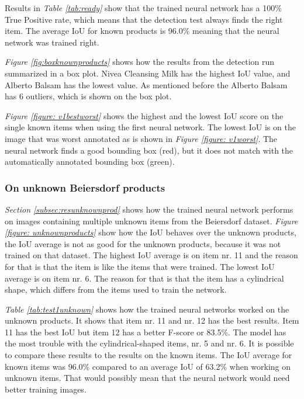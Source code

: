 Results in \textit{Table \ref{tab:ready}} show that the trained neural network has a 100\% True Positive rate, which means that the detection test always finds the right item. The average IoU for known products is 96.0\% meaning that the neural network was trained right.

\textit{Figure \ref{fig:boxknownproducts}} shows how the results from the detection run summarized in a box plot. Nivea Cleansing Milk has the highest IoU value, and Alberto Balsam has the lowest value. As mentioned before the Alberto Balsam has 6 outliers, which is shown on the box plot.

\textit{Figure \ref{figure: v1bestworst}} shows the highest and the lowest IoU score on the single known items when using the first neural network. The lowest IoU is on the image that was worst annotated as is shown in \textit{Figure \ref{figure: v1worst}}. The neural network finds a good bounding box (red), but it does not match with the automatically annotated bounding box (green).

\subsubsection{On unknown Beiersdorf products}
\textit{Section \ref{subsec:resunknownprod}} shows how the trained neural network performs on images containing multiple unknown items from the Beiersdorf dataset. \textit{Figure \ref{figure: unknownproducts}} show how the IoU behaves over the unknown products, the IoU average is not as good for the unknown products, because it was not trained on that dataset. The highest IoU average is on item nr. 11 and the reason for that is that the item is like the items that were trained. The lowest IoU average is on item nr. 6. The reason for that is that the item has a cylindrical shape, which differs from the items used to train the network.

\textit{Table \ref{tab:test1unknown}} shows how the trained neural networks worked on the unknown products. It shows that item nr. 11 and nr. 12 has the best results. Item 11 has the best IoU but item 12 has a better F-score or 83.5\%. The model has the most trouble with the cylindrical-shaped items, nr. 5 and nr. 6. It is possible to compare these results to the results on the known items. The IoU average for known items was 96.0\% compared to an average IoU of 63.2\% when working on unknown items. That would possibly mean that the neural network would need better training images. 

